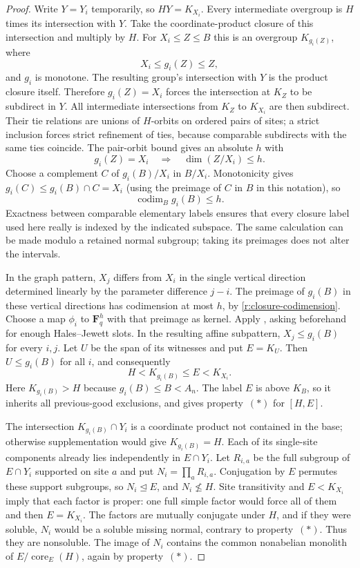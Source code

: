 \begin{proof}
Write $Y=Y_i$ temporarily, so $HY=K_{X_i}$.
Every intermediate overgroup is $H$ times its intersection with $Y$.
Take the coordinate-product closure of this intersection and multiply
by $H$.  For $X_i\le Z\le B$ this is an overgroup
$K_{g_i(Z)}$, where
\[
 X_i\le g_i(Z)\le Z,
\]
and $g_i$ is monotone.  The resulting group's intersection with $Y$
is the product closure itself.  Therefore $g_i(Z)=X_i$ forces the
intersection at $K_Z$ to be subdirect in $Y$.  All intermediate
intersections from $K_Z$ to $K_{X_i}$ are then subdirect.  Their
tie relations are unions of $H$-orbits on ordered pairs of sites;
a strict inclusion forces strict refinement of ties, because
comparable subdirects with the same ties coincide.  The pair-orbit
bound gives an absolute $h$ with
\[
 g_i(Z)=X_i\quad\Longrightarrow\quad\dim(Z/X_i)\le h.
\]
Choose a complement $C$ of $g_i(B)/X_i$ in $B/X_i$.
Monotonicity gives $g_i(C)\le g_i(B)\cap C=X_i$ (using the preimage
of $C$ in $B$ in this notation), so
\begin{equation}\label{r:closure-codimension}
 \operatorname{codim}_B g_i(B)\le h.
\end{equation}
Exactness between comparable elementary labels ensures that every
closure label used here really is indexed by the indicated subspace.
The same calculation can be made modulo a retained normal subgroup;
taking its preimages does not alter the intervals.

In the graph pattern, $X_j$ differs from $X_i$ in the single vertical
direction determined linearly by the parameter difference $j-i$.
The preimage of $g_i(B)$ in these vertical directions has codimension
at most $h$, by \eqref{r:closure-codimension}.  Choose a map $\phi_i$
to $\mathbf F_q^h$ with that preimage as kernel.
Apply , asking beforehand for enough
Hales--Jewett slots.  In the resulting affine subpattern,
$X_j\le g_i(B)$ for every $i,j$.  Let $U$ be the span of its witnesses
and put $E=K_U$.  Then $U\le g_i(B)$ for all $i$, and consequently
\[
 H<K_{g_i(B)}\le E<K_{X_i}.
\]
Here $K_{g_i(B)}>H$ because $g_i(B)\le B<A_n$.
The label $E$ is above $K_B$, so it inherits all previous-good
exclusions, and  gives property~\((*)\) for
$[H,E]$.

The intersection $K_{g_i(B)}\cap Y_i$ is a coordinate product not
contained in the base; otherwise supplementation would give
$K_{g_i(B)}=H$.  Each of its single-site components already lies
independently in $E\cap Y_i$.  Let $R_{i,a}$ be the full subgroup
of $E\cap Y_i$ supported on site $a$ and put
$N_i=\prod_aR_{i,a}$.  Conjugation by $E$ permutes these support
subgroups, so $N_i\trianglelefteq E$, and $N_i\not\le H$.
Site transitivity and $E<K_{X_i}$ imply that each factor is proper:
one full simple factor would force all of them and then $E=K_{X_i}$.
The factors are mutually conjugate under $H$, and if they were
soluble, $N_i$ would be a soluble missing normal, contrary to
property~\((*)\).  Thus they are nonsoluble.  The image of $N_i$
contains the common nonabelian monolith of
$E/\operatorname{core}_E(H)$, again by property~\((*)\).


\end{proof}
